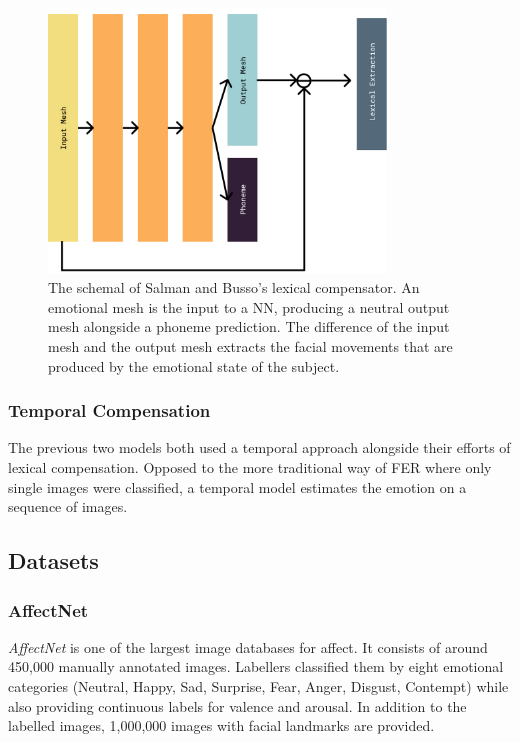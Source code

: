\begin{figure}
    \centering
    \includegraphics[width=0.8\textwidth]{res/BussoSE.pdf}
    \caption{The schemal of Salman and Busso's lexical compensator. An emotional mesh is the input to a NN, producing a neutral output mesh alongside a phoneme prediction. The difference of the input mesh and the output mesh extracts the facial movements that are produced by the emotional state of the subject.}
    \label{fig:bussose}
\end{figure}

\subsubsection{Temporal Compensation}
The previous two models both used a temporal approach alongside their efforts of lexical compensation. Opposed to the more traditional way of FER where only single images were classified, a temporal model estimates the emotion on a sequence of images. 


\subsection{Datasets}

\subsubsection{AffectNet}
\emph{AffectNet} is one of the largest image databases for affect. It consists of around 450,000 manually annotated images. Labellers classified them by eight emotional categories (Neutral, Happy, Sad, Surprise, Fear, Anger, Disgust, Contempt) while also providing continuous labels for valence and arousal. In addition to the labelled images, 1,000,000 images with facial landmarks are provided.

